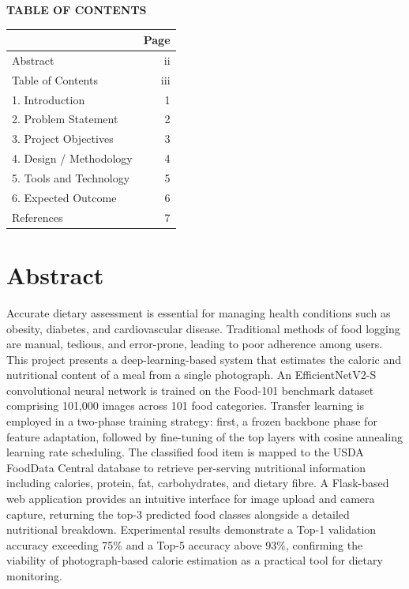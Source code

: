 \documentclass[12pt,a4paper]{article}
\begin{document}
\newpage
\begin{center}
{\Large \textbf{TABLE OF CONTENTS}}
\end{center}
\vspace{0.5cm}

\begin{tabularx}{\textwidth}{Xr}
\toprule
 & \textbf{Page} \\
\midrule
Abstract & ii \\
Table of Contents & iii \\
1. Introduction & 1 \\
2. Problem Statement & 2 \\
3. Project Objectives & 3 \\
4. Design / Methodology & 4 \\
5. Tools and Technology & 5 \\
6. Expected Outcome & 6 \\
References & 7 \\
\bottomrule
\end{tabularx}


\newpage
\section{Abstract}

Accurate dietary assessment is essential for managing health conditions such as obesity, diabetes, and cardiovascular disease. Traditional methods of food logging are manual, tedious, and error-prone, leading to poor adherence among users. This project presents a deep-learning-based system that estimates the caloric and nutritional content of a meal from a single photograph. An EfficientNetV2-S convolutional neural network is trained on the Food-101 benchmark dataset comprising 101,000 images across 101 food categories. Transfer learning is employed in a two-phase training strategy: first, a frozen backbone phase for feature adaptation, followed by fine-tuning of the top layers with cosine annealing learning rate scheduling. The classified food item is mapped to the USDA FoodData Central database to retrieve per-serving nutritional information including calories, protein, fat, carbohydrates, and dietary fibre. A Flask-based web application provides an intuitive interface for image upload and camera capture, returning the top-3 predicted food classes alongside a detailed nutritional breakdown. Experimental results demonstrate a Top-1 validation accuracy exceeding 75\% and a Top-5 accuracy above 93\%, confirming the viability of photograph-based calorie estimation as a practical tool for dietary monitoring.
\end{document}
